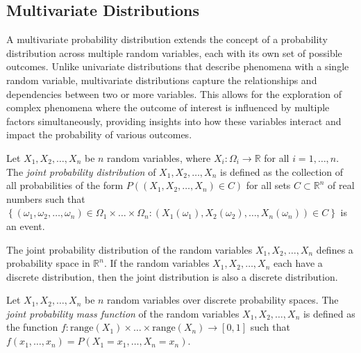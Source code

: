 
\subsection*{Multivariate Distributions}

A multivariate probability distribution extends the concept of a probability distribution across multiple random variables, each with its own set of possible outcomes. Unlike univariate distributions that describe phenomena with a single random variable, multivariate distributions capture the relationships and dependencies between two or more variables. This allows for the exploration of complex phenomena where the outcome of interest is influenced by multiple factors simultaneously, providing insights into how these variables interact and impact the probability of various outcomes.

\begin{definition}
Let $X_1, X_2, \ldots, X_n$ be $n$ random variables, where $X_i : \Omega_i \rightarrow \mathbb{R}$ for all $i=1, \ldots, n$. The \emph{joint probability distribution} of $X_1, X_2, \ldots, X_n$ is defined as the collection of all probabilities of the form $P\left( \left( X_1, X_2, \ldots, X_n \right) \in C \right)$ for all sets $C \subset \mathbb{R}^n$ of real numbers such that $\left\{ \left( \omega_1, \omega_2, \ldots, \omega_n \right) \in \Omega_1 \times \ldots \times \Omega_n : \left( X_1 \left( \omega_1 \right), X_2 \left( \omega_2 \right), \ldots, X_n \left( \omega_n \right) \right) \in C \right\}$ is an event.
\end{definition}

The joint probability distribution of the random variables $X_1, X_2, \ldots, X_n$ defines a probability space in $\mathbb{R}^n$. If the random variables $X_1, X_2, \ldots, X_n$ each have a discrete distribution, then the joint distribution is also a discrete distribution.

\begin{definition}
Let $X_1, X_2, \ldots, X_n$ be $n$ random variables over discrete probability spaces. The \emph{joint probability mass function} of the random variables $X_1, X_2, \ldots, X_n$ is defined as the function $f : \text{range} \left( X_1 \right) \times \ldots \times \text{range} \left( X_n \right) \rightarrow [0, 1]$ such that $f \left( x_1, \ldots, x_n \right) = P \left( X_1 = x_1, \ldots, X_n = x_n \right)$.
\end{definition}

